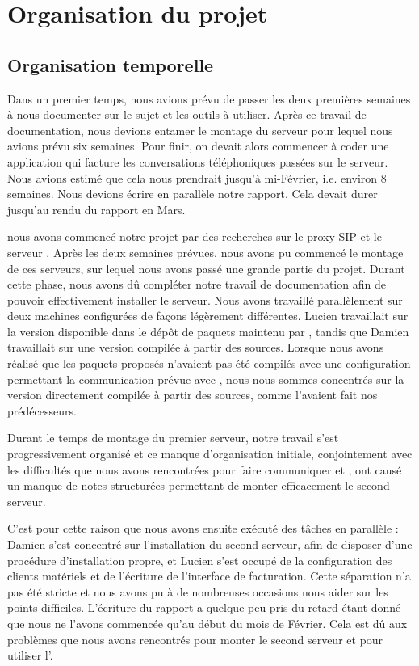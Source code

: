 \section{Organisation du projet}

\subsection{Organisation temporelle}




Dans un premier temps, nous avions prévu de passer les deux premières semaines à nous documenter sur le sujet et les outils à utiliser. Après ce travail de documentation, nous devions entamer le montage du serveur pour lequel nous avions prévu six semaines. Pour finir, on devait alors commencer à coder une application qui facture les conversations téléphoniques passées sur le serveur. Nous avions estimé que cela nous prendrait jusqu'à mi-Février, i.e. environ 8 semaines. Nous devions écrire en parallèle notre rapport. Cela devait durer jusqu'au rendu du rapport en Mars. 

 nous avons commencé notre projet par des recherches sur le proxy SIP {\kam} et le serveur {\frad}. Après les deux semaines prévues, nous avons pu commencé le montage de ces serveurs, sur lequel nous avons passé une grande partie du projet. Durant cette phase, nous avons dû compléter notre travail de documentation afin de pouvoir effectivement installer le serveur.
Nous avons travaillé parallèlement sur deux machines configurées de façons légèrement différentes. Lucien travaillait sur la version disponible dans le dépôt de paquets maintenu par {\kam}, tandis que Damien travaillait sur une version compilée à partir des sources. Lorsque nous avons réalisé que les paquets proposés n’avaient pas été compilés avec une configuration permettant la communication prévue avec {\frad}, nous nous sommes concentrés sur la version directement compilée à partir des sources, comme l’avaient fait nos prédécesseurs.

Durant le temps de montage du premier serveur, notre travail s’est progressivement organisé et ce manque d’organisation initiale, conjointement avec les difficultés que nous avons rencontrées pour faire communiquer {\kam} et {\frad}, ont causé un manque de notes structurées permettant de monter efficacement le second serveur.

C’est pour cette raison que nous avons ensuite exécuté des tâches en parallèle : Damien s’est concentré sur l’installation du second serveur, afin de disposer d’une procédure d’installation propre, et Lucien s’est occupé de la configuration des clients matériels et de l’écriture de l’interface de facturation. Cette séparation n’a pas été stricte et nous avons pu à de nombreuses occasions nous aider sur les points difficiles.
L'écriture du rapport a quelque peu pris du retard étant donné que nous ne l'avons commencée qu'au début du mois de Février. Cela est dû aux problèmes que nous avons rencontrés pour monter le second serveur et pour utiliser l'{\ata}.


